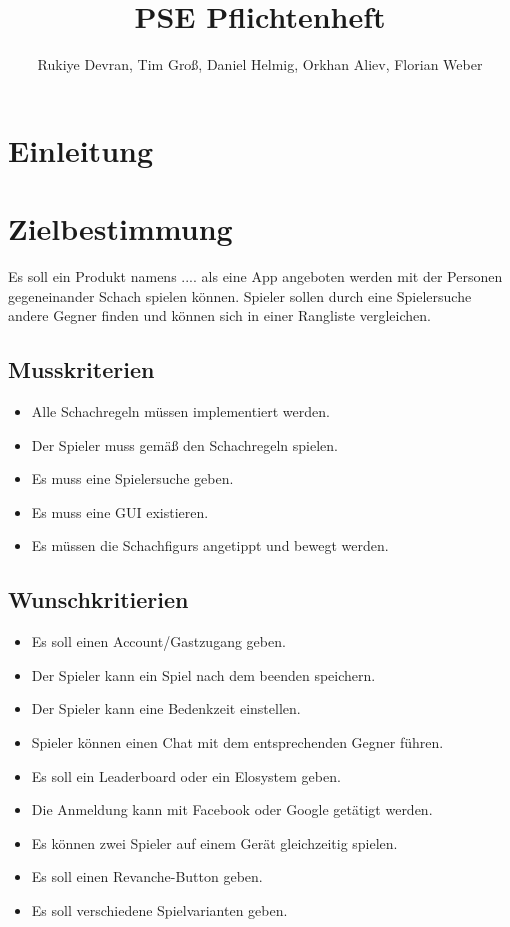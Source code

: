 \documentclass[parskip=full]{scrartcl}
\title{PSE Pflichtenheft}
\author{Rukiye Devran, Tim Groß, Daniel Helmig, Orkhan Aliev, Florian Weber}
\begin{document}
	\begin{titlepage}
	\maketitle	
	\newpage	
	\tableofcontents
	\pagebreak
	
	\end{titlepage}
\section{Einleitung}
\section{Zielbestimmung}
Es soll ein Produkt namens .... als eine App angeboten werden mit der Personen gegeneinander \gls{Schach} spielen können. Spieler sollen durch eine Spielersuche andere Gegner finden und können sich in einer Rangliste vergleichen. 
\subsection{Musskriterien}
\begin{itemize}[nosep]
\item Alle \gls{Schachregeln} müssen implementiert werden.
\item Der \gls{Spieler} muss gemäß den \gls{Schachregeln} spielen.
\item Es muss eine Spielersuche geben.
\item Es muss eine GUI existieren.
\item Es müssen die \glspl{Schachfigur} angetippt und bewegt werden.
\end{itemize}
\subsection{Wunschkritierien}
\begin{itemize}[nosep]
\item Es soll einen Account/Gastzugang geben.
\item Der \gls{Spieler} kann ein Spiel nach dem beenden speichern.
\item Der \gls{Spieler} kann eine Bedenkzeit einstellen.
\item \gls{Spieler} können einen Chat mit dem entsprechenden Gegner führen.
\item Es soll ein Leaderboard oder ein \gls{Elo}system geben.
\item Die Anmeldung kann mit Facebook oder Google getätigt werden.
\item Es können zwei \gls{Spieler} auf einem Gerät gleichzeitig spielen.
\item Es soll einen Revanche-Button geben.
\item Es soll verschiedene Spielvarianten geben.
\end{itemize}
\end{document}
